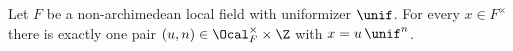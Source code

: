 Let $F$ be a non-archimedean local field with uniformizer $\unif$. For every $x\in F^\times$ there is exactly one
pair $(u,n)\in\Ocal_F^\times\times\Z$ with $x=u\,\unif^{n}$.
